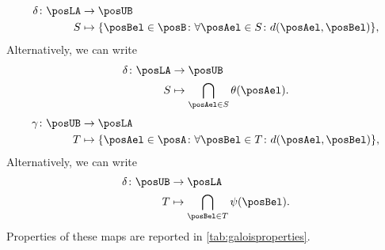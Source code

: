 %
\begin{equation}
    \label{eq:galoisdelta}
    \begin{aligned}
        \delta \colon \posLA&\to \posUB\\
        S&\mapsto \{\posBel\in \posB \colon \forall {\posAel\in S}\colon d(\posAel,\posBel)\},
    \end{aligned}
\end{equation}
Alternatively, we can write
\begin{equation}
    \begin{aligned}
        \delta\colon \posLA &\to \posUB\\
        S&\mapsto \bigcap_{\posAel\in S}\theta(\posAel).
    \end{aligned}
\end{equation}
%
\begin{equation}
    \label{eq:galoisgamma}
    \begin{aligned}
        \gamma \colon \posUB&\to \posLA\\
        T&\mapsto \{\posAel\in \posA \colon \forall {\posBel\in T}\colon d(\posAel,\posBel)\},
    \end{aligned}
\end{equation}
Alternatively, we can write
\begin{equation}
    \begin{aligned}
        \delta\colon \posUB &\to \posLA\\
        T&\mapsto \bigcap_{\posBel\in T}\psi(\posBel).
    \end{aligned}
\end{equation}
%
Properties of these maps are reported in \cref{tab:galoisproperties}.

